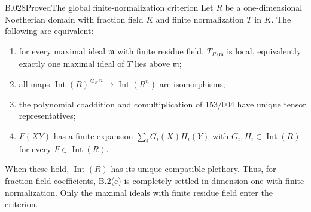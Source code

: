 \begin{saresult}{B.028}{Proved}{The global finite-normalization criterion}
Let $R$ be a one-dimensional Noetherian domain with fraction field
$K$ and finite normalization $T$ in $K$. The following are
equivalent:
\begin{enumerate}
\item for every maximal ideal $\mathfrak m$ with finite residue
field, $T_{R\setminus\mathfrak m}$ is local, equivalently exactly
one maximal ideal of $T$ lies above $\mathfrak m$;
\item all maps $\operatorname{Int}(R)^{\otimes_R n}
\to\operatorname{Int}(R^n)$ are isomorphisms;
\item the polynomial coaddition and comultiplication of 153/004
have unique tensor representatives;
\item $F(XY)$ has a finite expansion
$\sum_iG_i(X)H_i(Y)$ with $G_i,H_i\in\operatorname{Int}(R)$
for every $F\in\operatorname{Int}(R)$.
\end{enumerate}
When these hold, $\operatorname{Int}(R)$ has its unique compatible
plethory. Thus, for fraction-field coefficients, B.2(c) is completely
settled in dimension one with finite normalization. Only the
maximal ideals with finite residue field enter the criterion.
\end{saresult}
